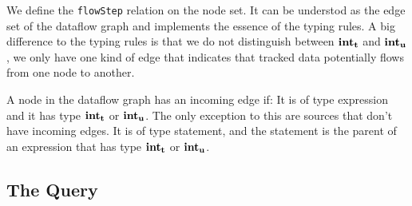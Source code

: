 We define the \texttt{flowStep} relation on the node set.
It can be understod as the edge set of the dataflow graph and implements the
essence of the typing rules.
A big difference to the typing rules is that we do not distinguish between $\textbf{int}_\textbf{t}$ and $\textbf{int}_\textbf{u}$,
we only have one kind of edge that indicates that tracked data potentially flows 
from one node to another.

A node in the dataflow graph has an incoming edge if:
It is of type expression and it has type $\textbf{int}_\textbf{t}$ or $\textbf{int}_\textbf{u}$.
The only exception to this are sources that don't have incoming edges.
It is of type statement, and the statement is the parent of an expression that has type
$\textbf{int}_\textbf{t}$ or $\textbf{int}_\textbf{u}$.




\subsection{The Query}